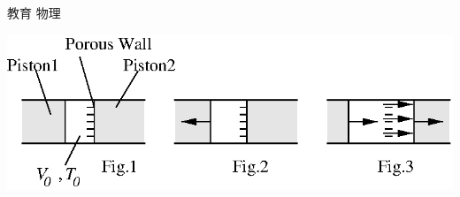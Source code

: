 \documentclass[fleqn]{jbook}
\begin{document}
\begin{question}{教育 物理}{}
\begin{subquestions}
\begin{subsubquestions}
  \end{subsubquestions}

  \begin{center}
    \mbox{\includegraphics[clip]{1994phys-1.eps}}
  \end{center}

\end{subquestions}
\end{question}
\end{document}

